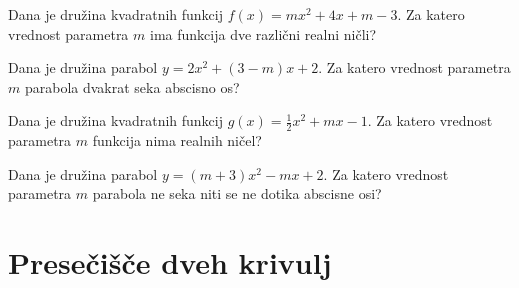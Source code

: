     



        

            \begin{naloga}
                Dana je družina kvadratnih funkcij $f(x)=mx^2+4x+m-3$.
                Za katero vrednost parametra $m$ ima funkcija dve različni realni ničli?
                                
            \end{naloga}


            \begin{naloga}
                Dana je družina parabol $y=2x^2+(3-m)x+2$.
                Za katero vrednost parametra $m$ parabola dvakrat seka abscisno os?
                
            \end{naloga}


            \begin{naloga}
                Dana je družina kvadratnih funkcij $g(x)=\frac{1}{2}x^2+mx-1$.
                Za katero vrednost parametra $m$ funkcija nima realnih ničel?
                                
            \end{naloga}


            \begin{naloga}
                Dana je družina parabol $y=(m+3)x^2-mx+2$.
                Za katero vrednost parametra $m$ parabola ne seka niti se ne dotika abscisne osi?
                
            \end{naloga}
    





\newpage
    \section{Presečišče dveh krivulj}




\newpage


